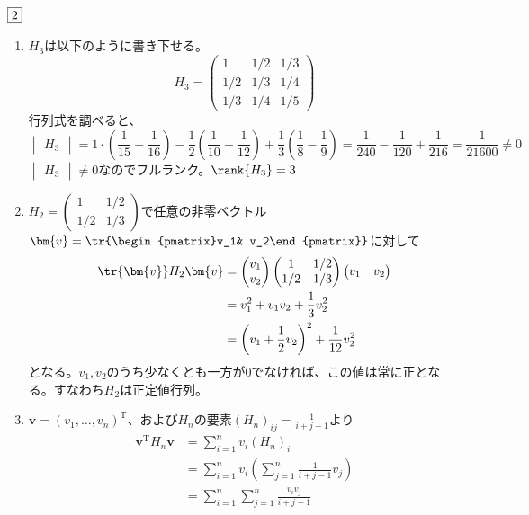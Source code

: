 \begin{souanswer} %
	$\fbox{2}$
\begin{enumerate}
	\item $H_3$は以下のように書き下せる。
\begin{equation*}
	H_3= 
\begin{pmatrix}
	1& 1/2& 1/3\\
	1/2& 1/3& 1/4\\
	1/3& 1/4& 1/5
\end{pmatrix}
\end{equation*}
	行列式を調べると、
\begin{equation*}
	\begin{vmatrix}H_3\end{vmatrix}= 1\cdot \left(\frac{1}{15}- \frac{1}{16}\right)- \frac{1}{2}\left(\frac{1}{10}- \frac{1}{12}\right)+ \frac{1}{3}\left(\frac{1}{8}- \frac{1}{9}\right)= \frac{1}{240}- \frac{1}{120}+ \frac{1}{216}= \frac{1}{21600}\ne 0
\end{equation*}
	$\begin{vmatrix}H_3\end{vmatrix}\ne 0$なのでフルランク。$\rank{H_3}= 3$

	\item $H_2= \begin{pmatrix}1& 1/2\\ 1/2& 1/3\end{pmatrix}$で任意の非零ベクトル$\bm{v}= \tr{\begin{pmatrix}v_1& v_2\end{pmatrix}}$に対して
\begin{align*}
	\tr{\bm{v}}H_2\bm{v}
	&= \begin{pmatrix}v_1\\ v_2\end{pmatrix}\begin{pmatrix}1& 1/2\\ 1/2& 1/3\end{pmatrix}\begin{pmatrix}v_1& v_2\end{pmatrix}\\
	&= v_1^2+ v_1v_2+ \frac{1}{3}v_2^2\\
	&= \left(v_1+ \frac{1}{2}v_2\right)^2+ \frac{1}{12}v_2^2
\end{align*}
	となる。$v_1, v_2$のうち少なくとも一方が0でなければ、この値は常に正となる。すなわち$H_2$は正定値行列。

	\item $\bm{v}= (v_1, \ldots, v_n)^\mathrm{T}$、および$H_n$の要素$(H_n)_{ij}= \frac{1}{i+ j- 1}$より
\begin{align*}
	\bm{v}^\mathrm{T}H_n\bm{v}
	&= \sum_{i= 1}^n v_i (H_n)_i\\
	&= \sum_{i= 1}^n v_i\left(\sum_{j= 1}^n \frac{1}{i+ j- 1}v_j\right)\\
	&= \sum_{i= 1}^n \sum_{j= 1}^n\frac{v_i v_j}{i+ j- 1}
\end{align*}


\end{enumerate}
\end{souanswer}
